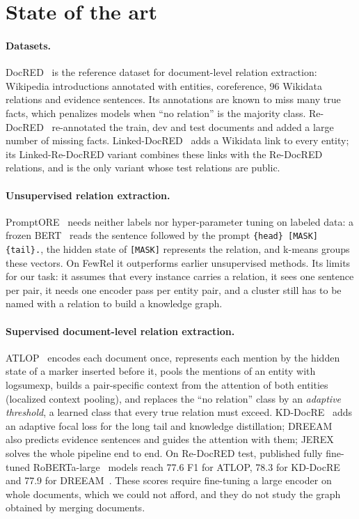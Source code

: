 \documentclass[pdflatex,sn-mathphys-num]{sn-jnl}
\begin{document}
\section{State of the art}\label{sec:sota}

\paragraph{Datasets.} DocRED~\cite{yao2019docred} is the reference dataset for document-level relation extraction: Wikipedia introductions annotated with entities, coreference, 96 Wikidata relations and evidence sentences. Its annotations are known to miss many true facts, which penalizes models when ``no relation'' is the majority class. Re-DocRED~\cite{tan2022redocred} re-annotated the train, dev and test documents and added a large number of missing facts. Linked-DocRED~\cite{genest2023linkeddocred} adds a Wikidata link to every entity; its Linked-Re-DocRED variant combines these links with the Re-DocRED relations, and is the only variant whose test relations are public.

\paragraph{Unsupervised relation extraction.} PromptORE~\cite{genest2023promptore} needs neither labels nor hyper-parameter tuning on labeled data: a frozen BERT~\cite{devlin2019bert} reads the sentence followed by the prompt \texttt{\{head\} [MASK] \{tail\}.}, the hidden state of \texttt{[MASK]} represents the relation, and k-means groups these vectors. On FewRel it outperforms earlier unsupervised methods. Its limits for our task: it assumes that every instance carries a relation, it sees one sentence per pair, it needs one encoder pass per entity pair, and a cluster still has to be named with a relation to build a knowledge graph.

\paragraph{Supervised document-level relation extraction.} ATLOP~\cite{zhou2021atlop} encodes each document once, represents each mention by the hidden state of a marker inserted before it, pools the mentions of an entity with logsumexp, builds a pair-specific context from the attention of both entities (localized context pooling), and replaces the ``no relation'' class by an \emph{adaptive threshold}, a learned class that every true relation must exceed. KD-DocRE~\cite{tan2022kddocre} adds an adaptive focal loss for the long tail and knowledge distillation; DREEAM~\cite{ma2023dreeam} also predicts evidence sentences and guides the attention with them; JEREX~\cite{eberts2021jerex} solves the whole pipeline end to end. On Re-DocRED test, published fully fine-tuned RoBERTa-large~\cite{liu2019roberta} models reach 77.6 F1 for ATLOP, 78.3 for KD-DocRE and 77.9 for DREEAM~\cite{tan2022redocred,ma2023dreeam}. These scores require fine-tuning a large encoder on whole documents, which we could not afford, and they do not study the graph obtained by merging documents.
\end{document}
